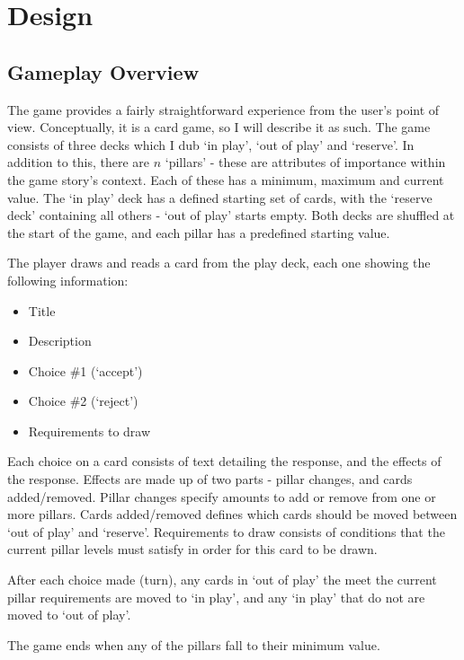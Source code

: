 \chapter{Design}

\todo{}

\section{Gameplay Overview}
The game provides a fairly straightforward experience from the user's point of view.
Conceptually, it is a card game, so I will describe it as such.
The game consists of three decks which I dub `in play', `out of play' and `reserve'. In addition to this, there are $n$ `pillars' - these are attributes of importance within the game story's context. Each of these has a minimum, maximum and current value.
The `in play' deck has a defined starting set of cards, with the `reserve deck' containing all others - `out of play' starts empty.
Both decks are shuffled at the start of the game, and each pillar has a predefined starting value.

The player draws and reads a card from the play deck, each one showing the following information:

\begin{itemize}
    \item Title
    \item Description
    \item Choice \#1 (`accept')
    \item Choice \#2 (`reject')
    \item Requirements to draw
\end{itemize}
Each choice on a card consists of text detailing the response, and the effects of the response. Effects are made up of two parts - pillar changes, and cards added/removed. Pillar changes specify amounts to add or remove from one or more pillars. Cards added/removed defines which cards should be moved between `out of play' and `reserve'.
Requirements to draw consists of conditions that the current pillar levels must satisfy in order for this card to be drawn.

After each choice made (turn), any cards in `out of play' the meet the current pillar requirements are moved to `in play', and any `in play' that do not are moved to `out of play'. 

The game ends when any of the pillars fall to their minimum value.

